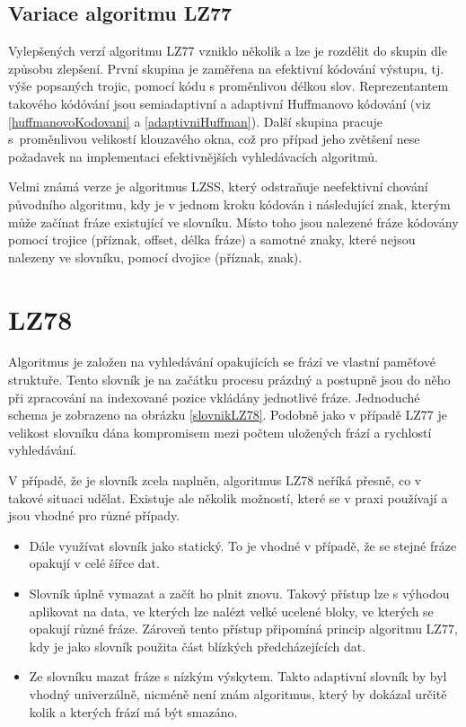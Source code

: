 \subsection{Variace algoritmu LZ77}
Vylepšených verzí algoritmu LZ77 vzniklo několik a lze je rozdělit do skupin dle způsobu zlepšení. První skupina je zaměřena na efektivní kódování výstupu, tj. výše popsaných trojic, pomocí kódu s proměnlivou délkou slov. Reprezentantem takového kódóvání jsou semiadaptivní a adaptivní Huffmanovo kódování (viz \ref{huffmanovoKodovani} a \ref{adaptivniHuffman}). Další skupina pracuje s~proměnlivou velikostí klouzavého okna, což pro případ jeho zvětšení nese požadavek na implementaci efektivnějších vyhledávacích algoritmů.

Velmi známá verze je algoritmus LZSS, který odstraňuje neefektivní chování původního algoritmu, kdy je v jednom kroku kódován i následující znak, kterým může začínat fráze existující ve slovníku. Místo toho jsou nalezené fráze kódovány pomocí trojice (příznak, offset, délka fráze) a samotné znaky, které nejsou nalezeny ve slovníku, pomocí dvojice (příznak, znak).

\section{LZ78}
Algoritmus je založen na vyhledávání opakujících se frází ve vlastní paměťové struktuře. Tento slovník je na začátku procesu prázdný a postupně jsou do něho při zpracování na indexované pozice vkládány jednotlivé fráze. Jednoduché schema je zobrazeno na obrázku \ref{slovnikLZ78}. Podobně jako v případě LZ77 je velikost slovníku dána kompromisem mezi počtem uložených frází a rychlostí vyhledávání.

V případě, že je slovník zcela naplněn, algoritmus LZ78 neříká přesně, co v takové situaci udělat. Existuje ale několik možností, které se v praxi používají a jsou vhodné pro různé případy.

\begin{itemize}
\item Dále využívat slovník jako statický. To je vhodné v případě, že se stejné fráze opakují v celé šířce dat.
\item Slovník úplně vymazat a začít ho plnit znovu. Takový přístup lze s výhodou aplikovat na data, ve kterých lze nalézt velké ucelené bloky, ve kterých se opakují různé fráze. Zároveň tento přístup připomíná princip algoritmu LZ77, kdy je jako slovník použita část blízkých předcházejících dat.
\item Ze slovníku mazat fráze s nízkým výskytem. Takto adaptivní slovník by byl vhodný univerzálně, nicméně není znám algoritmus, který by dokázal určitě kolik a kterých frází má být smazáno.
\end{itemize}

